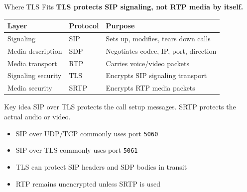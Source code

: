 \documentclass[aspectratio=169]{beamer}
\begin{document}
\begin{frame}{Where TLS Fits}
\textbf{TLS protects SIP signaling, not RTP media by itself.}

\begin{center}
\begin{tabular}{lll}
\textbf{Layer} & \textbf{Protocol} & \textbf{Purpose} \\
\hline
Signaling & SIP & Sets up, modifies, tears down calls \\
Media description & SDP & Negotiates codec, IP, port, direction \\
Media transport & RTP & Carries voice/video packets \\
Signaling security & TLS & Encrypts SIP signaling transport \\
Media security & SRTP & Encrypts RTP media packets \\
\end{tabular}
\end{center}

\vspace{0.3cm}

\begin{block}{Key idea}
SIP over TLS protects the call setup messages. SRTP protects the actual audio or video.
\end{block}

\vspace{0.2cm}

\begin{itemize}
    \item SIP over UDP/TCP commonly uses port \texttt{5060}
    \item SIP over TLS commonly uses port \texttt{5061}
    \item TLS can protect SIP headers and SDP bodies in transit
    \item RTP remains unencrypted unless SRTP is used
\end{itemize}

\end{frame}
\end{document}
